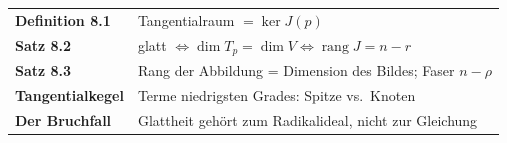 \begin{merksatz}
\begin{center}
\renewcommand{\arraystretch}{1.5}
\begin{tabular}{@{}P{3.0cm}P{5.6cm}@{}}
\toprule
\textbf{Definition 8.1} & Tangentialraum $= \ker J(p)$\\
\textbf{Satz 8.2} & glatt $\iff\dim T_p = \dim V\iff\operatorname{rang}J = n - r$\\
\textbf{Satz 8.3} & Rang der Abbildung = Dimension des Bildes; Faser $n - \rho$\\
\textbf{Tangentialkegel} & Terme niedrigsten Grades: Spitze vs.\ Knoten\\
\textbf{Der Bruchfall} & Glattheit gehört zum Radikalideal, nicht zur Gleichung\\
\bottomrule
\end{tabular}
\end{center}

\begin{center}
\begin{minipage}{0.88\textwidth}
\end{minipage}
\end{center}
\end{merksatz}
